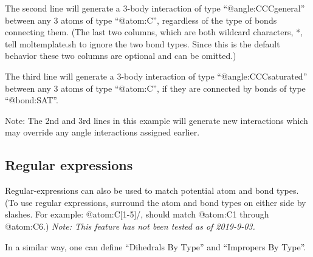 \documentclass[11pt]{article}
\begin{document}
The second line will generate a 3-body interaction 
of type \mbox{``@angle:CCCgeneral''}
between any 3 atoms of type \mbox{``@atom:C''},
regardless of the type of bonds connecting them.
(The last two columns, which are both wildcard characters, *, 
 tell moltemplate.sh to ignore the two bond types.
 Since this is the default behavior 
 these two columns are optional and can be omitted.)

The third line will generate a 3-body interaction of
type \mbox{``@angle:CCCsaturated''}
between any 3 atoms of type \mbox{``@atom:C''},
if they are connected by bonds of type \mbox{``@bond:SAT''}.

Note: The 2nd and 3rd lines in this example will generate new interactions 
which may override any angle interactions assigned earlier.

\subsection*{Regular expressions}
Regular-expressions can also be used to match potential atom and bond types.
(To use regular expressions, surround the atom and 
bond types on either side by slashes.  
For example: \mbox{@atom:C[1-5]/}, should match 
\mbox{@atom:C1} through \mbox{@atom:C6}.)
\textit{Note: This feature has not been tested as of 2019-9-03.}

In a similar way, one can define ``Dihedrals By Type'' and 
``Impropers By Type''.


\end{document}
